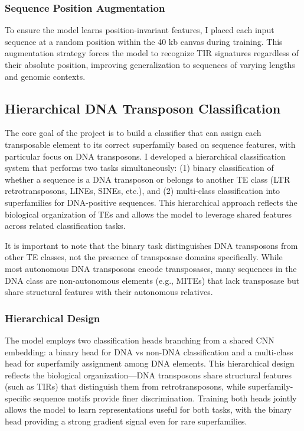 \documentclass[12pt]{article}
\begin{document}
\subsubsection{Sequence Position Augmentation}

To ensure the model learns position-invariant features, I placed each input sequence at a random position within the 40 kb canvas during training. This augmentation strategy forces the model to recognize TIR signatures regardless of their absolute position, improving generalization to sequences of varying lengths and genomic contexts.



\subsection{Hierarchical DNA Transposon Classification}

The core goal of the project is to build a classifier that can assign each transposable element to its correct superfamily based on sequence features, with particular focus on DNA transposons. I developed a hierarchical classification system that performs two tasks simultaneously: (1) binary classification of whether a sequence is a DNA transposon or belongs to another TE class (LTR retrotransposons, LINEs, SINEs, etc.), and (2) multi-class classification into superfamilies for DNA-positive sequences. This hierarchical approach reflects the biological organization of TEs and allows the model to leverage shared features across related classification tasks.

It is important to note that the binary task distinguishes DNA transposons from other TE classes, not the presence of transposase domains specifically. While most autonomous DNA transposons encode transposases, many sequences in the DNA class are non-autonomous elements (e.g., MITEs) that lack transposase but share structural features with their autonomous relatives.

\subsubsection{Hierarchical Design}

The model employs two classification heads branching from a shared CNN embedding: a binary head for DNA vs non-DNA classification and a multi-class head for superfamily assignment among DNA elements. This hierarchical design reflects the biological organization---DNA transposons share structural features (such as TIRs) that distinguish them from retrotransposons, while superfamily-specific sequence motifs provide finer discrimination. Training both heads jointly allows the model to learn representations useful for both tasks, with the binary head providing a strong gradient signal even for rare superfamilies.
\end{document}
